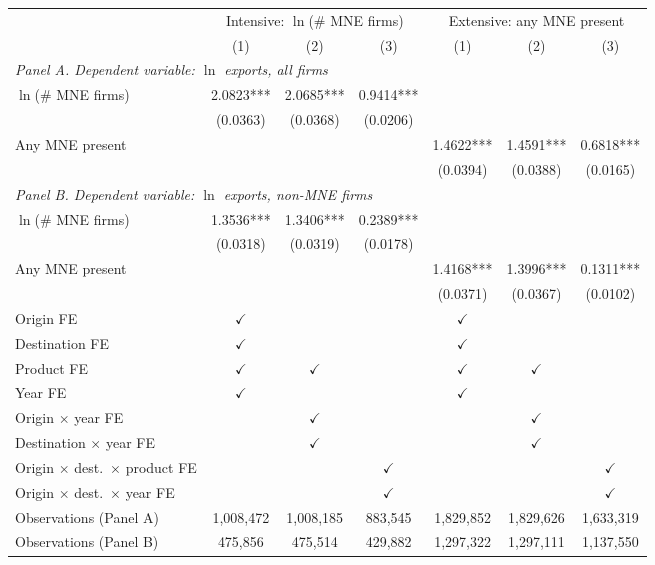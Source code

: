 \begin{tabular}{lcccccc} \hline
 & \multicolumn{3}{c}{Intensive: $\ln$(\# MNE firms)} & \multicolumn{3}{c}{Extensive: any MNE present} \\
 & (1) & (2) & (3) & (1) & (2) & (3) \\ \hline
\multicolumn{7}{l}{\textit{Panel A. Dependent variable: $\ln$ exports, all firms}} \\
$\ln$(\# MNE firms) & 2.0823*** & 2.0685*** & 0.9414*** &  &  &  \\
 & (0.0363) & (0.0368) & (0.0206) &  &  &  \\
Any MNE present &  &  &  & 1.4622*** & 1.4591*** & 0.6818*** \\
 &  &  &  & (0.0394) & (0.0388) & (0.0165) \\
\midrule
\multicolumn{7}{l}{\textit{Panel B. Dependent variable: $\ln$ exports, non-MNE firms}} \\
$\ln$(\# MNE firms) & 1.3536*** & 1.3406*** & 0.2389*** &  &  &  \\
 & (0.0318) & (0.0319) & (0.0178) &  &  &  \\
Any MNE present &  &  &  & 1.4168*** & 1.3996*** & 0.1311*** \\
 &  &  &  & (0.0371) & (0.0367) & (0.0102) \\
\hline
Origin FE & $\checkmark$ &  &  & $\checkmark$ &  &  \\
Destination FE & $\checkmark$ &  &  & $\checkmark$ &  &  \\
Product FE & $\checkmark$ & $\checkmark$ &  & $\checkmark$ & $\checkmark$ &  \\
Year FE & $\checkmark$ &  &  & $\checkmark$ &  &  \\
Origin $\times$ year FE &  & $\checkmark$ &  &  & $\checkmark$ &  \\
Destination $\times$ year FE &  & $\checkmark$ &  &  & $\checkmark$ &  \\
Origin $\times$ dest.\ $\times$ product FE &  &  & $\checkmark$ &  &  & $\checkmark$ \\
Origin $\times$ dest.\ $\times$ year FE &  &  & $\checkmark$ &  &  & $\checkmark$ \\
Observations (Panel A) & 1,008,472 & 1,008,185 & 883,545 & 1,829,852 & 1,829,626 & 1,633,319 \\
Observations (Panel B) & 475,856 & 475,514 & 429,882 & 1,297,322 & 1,297,111 & 1,137,550 \\
\hline
\end{tabular}
